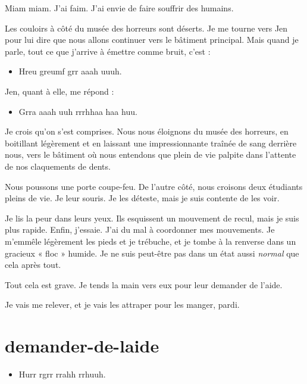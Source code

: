 Miam miam. J'ai faim. J'ai envie de faire souffrir des humains.

Les couloirs à côté du musée des horreurs sont déserts. Je me tourne vers Jen pour lui dire que nous allons continuer vers le bâtiment principal. Mais quand je parle, tout ce que j'arrive à émettre comme bruit, c'est :

\begin{itemize}
\item Hreu greumf grr aaah uuuh.
\end{itemize}

Jen, quant à elle, me répond :

\begin{itemize}
\item Grra aaah uuh rrrhhaa haa huu.
\end{itemize}

Je crois qu'on s'est comprises. Nous nous éloignons du musée des horreurs, en boitillant légèrement et en laissant une impressionnante traînée de sang derrière nous, vers le bâtiment où nous entendons que plein de vie palpite dans l'attente de nos claquements de dents.

Nous poussons une porte coupe-feu. De l'autre côté, nous croisons deux étudiants pleins de vie. Je leur souris. Je les déteste, mais je suis contente de les voir.

Je lis la peur dans leurs yeux. Ils esquissent un mouvement de recul, mais je suis plus rapide. Enfin, j'essaie. J'ai du mal à coordonner mes mouvements. Je m'emmêle légèrement les pieds et je trébuche, et je tombe à la renverse dans un gracieux « floc » humide. Je ne suis peut-être pas dans un état aussi \textit{normal} que cela après tout.

\item Tout cela est grave. Je tends la main vers eux pour leur demander de l'aide. 
\item Je vais me relever, et je vais les attraper pour les manger, pardi. 
\enw

\section{demander-de-laide}

\begin{itemize}
\item Hurr rgrr rrahh rrhuuh.
\end{itemize}

